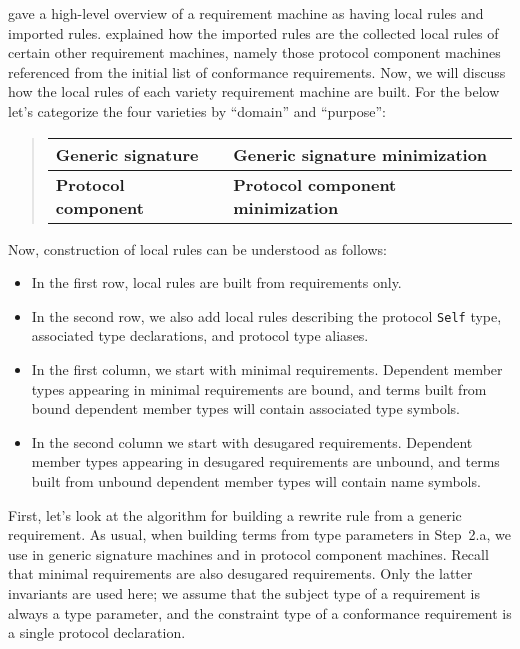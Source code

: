 \documentclass[../generics]{subfiles}
\begin{document}
 gave a high-level overview of a requirement machine as having local rules and imported rules.  explained how the imported rules are the collected local rules of certain other requirement machines, namely those protocol component machines referenced from the initial list of conformance requirements. Now, we will discuss how the local rules of each variety requirement machine are built. For the below let's categorize the four varieties by ``domain'' and ``purpose'':
\begin{quote}
\begin{tabular}{|l|l|}
\hline
\textbf{Generic signature}&\textbf{Generic signature minimization}\\
\hline
\textbf{Protocol component}&\textbf{Protocol component minimization}\\
\hline
\end{tabular}
\end{quote}
Now, construction of local rules can be understood as follows:
\begin{itemize}
\item In the first row, local rules are built from requirements only.

%
\item In the second row, we also add local rules describing the protocol \texttt{Self} type, associated type declarations, and protocol type aliases.

%
%
\item In the first column, we start with minimal requirements. Dependent member types appearing in minimal requirements are bound, and terms built from bound dependent member types will contain associated type symbols.

%
%
\item In the second column we start with desugared requirements. Dependent member types appearing in desugared requirements are unbound, and terms built from unbound dependent member types will contain name symbols.
\end{itemize}
First, let's look at the algorithm for building a rewrite rule from a generic requirement. As usual, when building terms from type parameters in Step~2.a, we use  in generic signature machines and  in protocol component machines. Recall that minimal requirements are also desugared requirements. Only the latter invariants are used here; we assume that the subject type of a requirement is always a type parameter, and the constraint type of a conformance requirement is a single protocol declaration.
\end{document}
